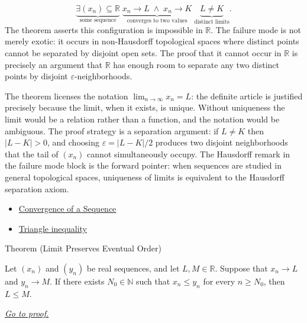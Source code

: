 \begin{remark*}
\[
\underbrace{\exists (x_n) \subseteq \mathbb{R}}_{\text{some sequence}}
\;\underbrace{x_n \to L \;\land\; x_n \to K}_{\text{converges to two values}}
\;\underbrace{L \neq K}_{\text{distinct limits}}.
\]
The theorem asserts this configuration is impossible in $\mathbb{R}$.
The failure mode is not merely exotic: it occurs in non-Hausdorff
topological spaces where distinct points cannot be separated by disjoint
open sets. The proof that it cannot occur in $\mathbb{R}$ is precisely
an argument that $\mathbb{R}$ has enough room to separate any two
distinct points by disjoint $\varepsilon$-neighborhoods.
\end{remark*}

\begin{remark*}[Interpretation]
The theorem licenses the notation $\displaystyle\lim_{n \to \infty} x_n
= L$: the definite article is justified precisely because the limit,
when it exists, is unique. Without uniqueness the limit would be a
relation rather than a function, and the notation would be ambiguous.
The proof strategy is a separation argument: if $L \neq K$ then
$|L - K| > 0$, and choosing $\varepsilon = |L - K|/2$ produces two
disjoint neighborhoods that the tail of $(x_n)$ cannot simultaneously
occupy. The Hausdorff remark in the failure mode block is the forward
pointer: when sequences are studied in general topological spaces,
uniqueness of limits is equivalent to the Hausdorff separation axiom.
\end{remark*}

\begin{dependencies}
\begin{itemize}
  \item \hyperref[def:convergent-sequence]{Convergence of a Sequence}
  \item \hyperref[thm:triangle-inequality]{Triangle inequality}
\end{itemize}
\end{dependencies}


\begin{theorembox}{Theorem (Limit Preserves Eventual Order)}
\begin{theorem}
\label{thm:limit-preserves-eventual-order}

Let $(x_n)$ and $(y_n)$ be real sequences, and let $L,M\in\mathbb{R}$.
Suppose that $x_n\to L$ and $y_n\to M$. If there exists
$N_0\in\mathbb{N}$ such that $x_n\le y_n$ for every $n\ge N_0$, then
$L\le M$.

\smallskip
\noindent
\hyperref[prf:limit-preserves-eventual-order]{\textit{Go to proof.}}
\end{theorem}
\end{theorembox}

